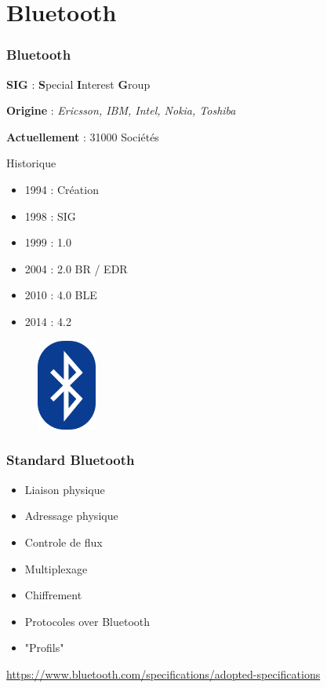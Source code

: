 \section{Bluetooth}

\begin{frame}
	\frametitle{Bluetooth}
	\textbf{SIG} : {\textbf{S}pecial \textbf{I}nterest \textbf{G}roup}

	\textbf{Origine} : {\small{\textit{Ericsson, IBM, Intel, Nokia, Toshiba}}}

	\textbf{Actuellement} : {\small{31000 Sociétés}}

	\begin{minipage}[t]{0.50\linewidth}
		\begin{block}{Historique}
			\begin{itemize}
				\item 1994 : Création
				\item 1998 : SIG
				\item 1999 : 1.0
				\item 2004 : 2.0 BR / EDR
				\item 2010 : 4.0 BLE
				\item 2014 : 4.2
			\end{itemize}
		\end{block}
	\end{minipage}
	\begin{minipage}[t]{0.45\linewidth}
		\begin{figure}
			\begin{center}
			\includegraphics[height=3cm]{img/bt_logo.png}
			\end{center}
		\end{figure}
	\end{minipage}
\end{frame}

\begin{frame}
	\frametitle{Standard Bluetooth}
	\vspace{0.5cm}
	\begin{itemize}
		\item Liaison physique
		\item Adressage physique
		\item Controle de flux
		\item Multiplexage
		\item Chiffrement
		\item Protocoles over Bluetooth
		\item "Profils"
	\end{itemize}
	\vspace{0.5cm}
	\tiny{\url{https://www.bluetooth.com/specifications/adopted-specifications}}
\end{frame}

